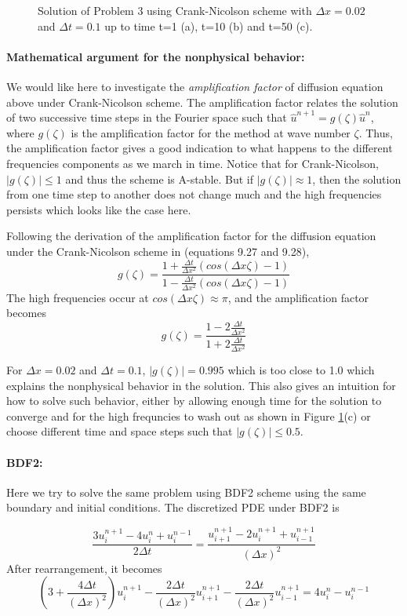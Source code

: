 \begin{figure}[!tbh]
  \caption{Solution of Problem 3 using Crank-Nicolson scheme with $\Delta x=0.02$ and $\Delta t=0.1$ up to time t=1 (a), t=10 (b) and t=50 (c).}
   \label{fig:cn}
\end{figure} 
\paragraph{Mathematical argument for the nonphysical behavior:}
We would like here to investigate the \emph{amplification factor} of diffusion equation above under Crank-Nicolson scheme. The amplification factor relates the solution of two successive time steps in the Fourier space such that $\hat{u}^{n+1}=g(\zeta)\hat{u}^n$, where $g(\zeta)$ is the amplification factor for the method at wave number $\zeta$\cite{leveque2007finite}. Thus, the amplification factor gives a good indication to what happens to the different frequencies components as we march in time. Notice that for Crank-Nicolson, $|g(\zeta)|\leq 1$ and thus the scheme is A-stable. But if $|g(\zeta)| \approx 1$, then the solution from one time step to another does not change much and the high frequencies persists which looks like the case here. 

Following the derivation of the amplification factor for the diffusion equation under the Crank-Nicolson scheme in \cite {leveque2007finite} (equations 9.27 and 9.28), 
$$g(\zeta) = \frac{1+\frac{\Delta t}{\Delta x^{2}}(cos(\Delta x\zeta)-1)}{1-\frac{\Delta t}{\Delta x^{2}}(cos(\Delta x\zeta)-1)}$$ 
The high frequencies occur at $cos(\Delta x\zeta)\approx\pi$, and the amplification factor becomes
$$g(\zeta) = \frac{1-2\frac{\Delta t}{\Delta x^{2}}}{1+2\frac{\Delta t}{\Delta x^{2}}}$$ 

For $\Delta x =0.02$ and $\Delta t=0.1$, $|g(\zeta)|=0.995$ which is too close to 1.0 which explains the nonphysical behavior in the solution. This also gives an intuition for how to solve such behavior, either by allowing enough time for the solution to converge and for the high frequncies to wash out as shown in Figure \ref{fig:cn}(c) or choose different time and space steps such that $|g(\zeta)|\leq0.5$.

\paragraph{BDF2:}
Here we try to solve the same problem using BDF2 scheme using the same boundary and initial conditions. The discretized PDE under BDF2 is

$$
\frac{3u_{i}^{n+1}-4u_{i}^{n}+u_{i}^{n-1}}{2\Delta t} = \frac{u_{i+1}^{n+1} -2u_{i}^{n+1}+u_{i-1}^{n+1}}{(\Delta x)^{2}}
$$
After rearrangement, it becomes 
$$
(3+\frac{4\Delta t}{(\Delta x)^{2}})u_{i}^{n+1} - \frac{2\Delta t}{(\Delta x)^2}u_{i+1}^{n+1} - \frac{2\Delta t}{(\Delta x)^2}u_{i-1}^{n+1} = 4u_{i}^{n} - u_{i}^{n-1}
$$

